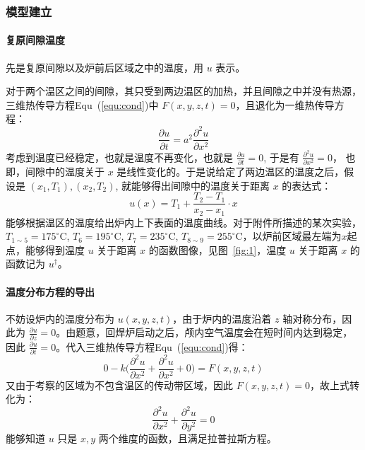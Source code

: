 \documentclass[../main.tex]{subfiles}
\begin{document}
\subsubsection{模型建立}
\paragraph{复原间隙温度} 先是复原间隙以及炉前后区域之中的温度，用 \(u\) 表示。

对于两个温区之间的间隙，其只受到两边温区的加热，并且间隙之中并没有热源，三维热传导方程Equ~(\ref{equ:cond})中 \(F ( x , y , z ,t) = 0\)，且退化为一维热传导方程：
\begin{equation}
\frac{\partial u}{\partial t} = a^{2} \frac{\partial ^{2} u}{ \partial x ^{2}}
\end{equation}
考虑到温度已经稳定，也就是温度不再变化，也就是 \(\frac{\partial u}{ \partial t} = 0\), 于是有 \(\frac{\partial ^{2} u}{\partial x ^{2}} = 0 \)，
也即，间隙中的温度关于 \(x\) 是线性变化的。于是说给定了两边温区的温度之后，假设是 \((x_1, T_1), (x_2, T_2)\), 就能够得出间隙中的温度关于距离 \(x\) 的表达式：
\[
u(x)  = T_{1} + \frac{T_2 - T_1}{x_2 - x_1} \cdot x
\]
能够根据温区的温度给出炉内上下表面的温度曲线。对于附件所描述的某次实验，\(T _{1 \sim 5} = 17 5 ^{\circ}\mathrm{C}\), \(T _{6} = 195 ^{\circ}\mathrm{C}\), \(T _{7} = 235 ^{\circ}\mathrm{C}\), \(T _{8 \sim 9} = 255 ^{\circ}\mathrm{C}\)，以炉前区域最左端为\(x\)起点，能够得到温度 \(u\) 关于距离 \(x\) 的函数图像，见图~\ref{fig:1}，温度 \(u\) 关于距离 \(x\) 的函数记为 \(u ^{\dagger}\)。


\paragraph{温度分布方程的导出}
不妨设炉内的温度分布为 \(u ( x,  y  ,z ,t)\)，由于炉内的温度沿着 \(z\) 轴对称分布，因此为 \(\frac{\partial u}{ \partial z} = 0\)。由题意，回焊炉启动之后，颅内空气温度会在短时间内达到稳定，因此 \( \frac{\partial u}{ \partial t} = 0\)。代入三维热传导方程Equ~(\ref{equ:cond})得：
\begin{equation}
0 - k \bigg( \frac{\partial ^{2} u }{\partial x ^{2}} + \frac{\partial ^{2} u}{\partial x ^{2}} + 0\bigg) = F (x , y, z , t)
\end{equation}
又由于考察的区域为不包含温区的传动带区域，因此 \(F (x, y , z , t) = 0\)，故上式转化为：
\begin{equation}
\frac{\partial ^{2} u}{\partial x ^{2}} + \frac{\partial ^{2} u}{\partial y ^{2}} = 0
\end{equation}
能够知道 \(u\) 只是 \(x , y\) 两个维度的函数，且满足拉普拉斯方程。
\end{document}
